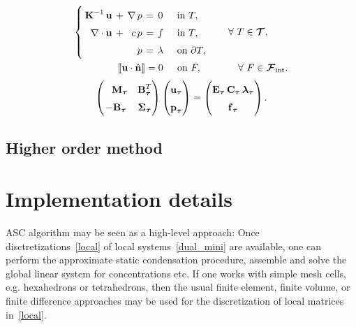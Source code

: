 \begin{eqnarray}
	\arraycolsep=2pt\def\arraystretch{1.5}
	\left\{\begin{array}{rcrccl}
	\vect K^{-1}\,\vect u                   & + & \nabla\,p & = & 0       &\quad\text{in } \bcell, \\
	\nabla\cdot\vect u                      & + & c\,p      & = & f       &\quad\text{in } \bcell, \\
											&   & p         & = & \lambda &\quad\text{on } \partial\bcell, %
	\end{array}\right.
	& \qquad \forall~\bcell\in\bmesh, \label{dual_mini} \\
		\llbracket\vect u \cdot \hat{\vect n}\rrbracket = 0\quad\:\:\text{on } F,\:\:\:\:
	& \qquad\quad \forall~F\in\bfaces[int]. \label{flux_cond}
\end{eqnarray}
\begin{equation}\label{local}
	\begin{pmatrix}
		\phantom{-}\vect M_\mmesh & \vect B^T_\mmesh \\
		-\vect B_\mmesh & \vect \Sigma_\mmesh
	\end{pmatrix}
	\begin{pmatrix} {\vect u}_\mmesh \\ {\vect p}_\mmesh \end{pmatrix}
	=
	\begin{pmatrix} \vect E_\mmesh\,\vect C_\mmesh\,{\vect \lambda}_\mmesh \\ {\vect f}_\mmesh \end{pmatrix}.
\end{equation}

\subsection{Higher order method} 


\section{Implementation details}

ASC algorithm may be seen as a high-level approach: Once disctretizations~\eqref{local} of local systems~\eqref{dual_mini} are available, one can perform the approximate static condensation procedure, assemble and solve the global linear system for concentrations etc. If one works with simple mesh cells, e.g. hexahedrons or tetrahedrons, then the usual finite element, finite volume, or finite difference approaches may be used for the discretization of local matrices in~\eqref{local}. 

